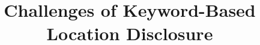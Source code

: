 \documentclass{sig-alternate-2013}
\begin{document}
\title{Challenges of Keyword-Based Location Disclosure}

%
%
%
%
%
\end{document}
